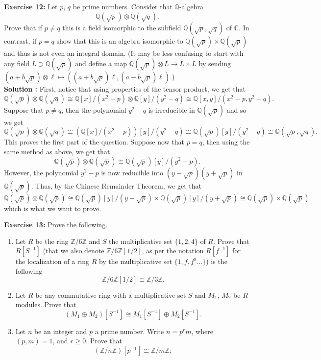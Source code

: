 \documentclass{article}
\newcommand{\C}{\mathbb{C}}
\newcommand{\Q}{\mathbb{Q}}
\newcommand{\Zn}[1]{\mathbb{Z}/ #1 \mathbb{Z}}
\newcommand{\isomorphic}{\cong}
\begin{document}
\newpage

\noindent \textbf{Exercise 12:} Let $p$, $q$ be prime numbers. Consider that $\Q$-algebra
$$\Q(\sqrt{p}) \otimes \Q(\sqrt{q}).$$
Prove that if $p \neq q$ this is a field isomorphic to the subfield $\Q(\sqrt{p}, \sqrt{q})$ of $\C$. In contrast, if $p = q$ show that this is an algebra isomorphic to $\Q(\sqrt{p}) \times \Q(\sqrt{p})$ and thus is not even an integral domain. (It may be less confusing to start with any field $L \supset \Q(\sqrt{p})$  and define a map $\Q(\sqrt{p}) \otimes L \to L \times L$ by sending $(a + b\sqrt{p}) \otimes \ell \mapsto ((a + b\sqrt{p})\ell, (a - b\sqrt{p})\ell)$.) \\

\noindent \textbf{Solution :} First, notice that using properties of the tensor product, we get that
$$\Q(\sqrt{p}) \otimes \Q(\sqrt{q}) \isomorphic \Q[x]/(x^2 - p) \otimes \Q[y]/(y^2 - q) \isomorphic \Q[x,y] /(x^2 - p, y^2 - q).$$
Suppose that $p \neq q$, then the polynomial $y^2 - q$ is irreducible in $\Q(\sqrt{p})$ and so we get
$$\Q(\sqrt{p}) \otimes \Q(\sqrt{q}) \isomorphic (\Q[x]/(x^2 - p))[y]/(y^2 - q) \isomorphic \Q(\sqrt{p})[y] / (y^2 - q) \isomorphic \Q(\sqrt{p}, \sqrt{q}).$$
This proves the first part of the question. Suppose now that $p = q$, then using the same method as above, we get that
$$\Q(\sqrt{p}) \otimes \Q(\sqrt{p}) \isomorphic \Q(\sqrt{p})[y]/(y^2 - p).$$
However, the polynomial $y^2 - p$ is now reducible into $(y - \sqrt{p})(y + \sqrt{p})$ in $\Q(\sqrt{p})$. Thus, by the Chinese Remainder Theorem, we get that
$$\Q(\sqrt{p}) \otimes \Q(\sqrt{p}) \isomorphic \Q(\sqrt{p})[y]/(y - \sqrt{p}) \times \Q(\sqrt{p})[y]/(y + \sqrt{p}) \isomorphic \Q(\sqrt{p}) \times \Q(\sqrt{p})$$
which is what we want to prove.

\newpage

\noindent \textbf{Exercise 13:} Prove the following.
\begin{enumerate}[label=(\alph*)]
    \item Let $R$ be the ring $\Zn{6}$ and $S$ the multiplicative set $\{1, 2, 4\}$ of $R$. Prove that $R[S^{-1}]$ (that we also denote $\Zn{6}[1/2]$, as per the notation $R[f^{-1}]$ for the localization of a ring $R$ by the multiplicative set $\{1, f, f^2 \dots\}$) is the following
    $$\Zn{6}[1/2] \isomorphic \Zn{3}.$$
    \item Let $R$ be any commutative ring with a multiplicative set $S$ and $M_1$, $M_2$ be $R$ modules. Prove that
    $$(M_1 \oplus M_2)[S^{-1}] \isomorphic M_1[S^{-1}] \oplus M_2[S^{-1}].$$
    \item Let $n$ be an integer and $p$ a prime number. Write $n = p^rm$, where $(p,m) = 1$, and $r \geq 0$. Prove that
    $$(\Zn{n})[p^{-1}] \isomorphic \Zn{m};$$
\end{enumerate} 
\end{document}

